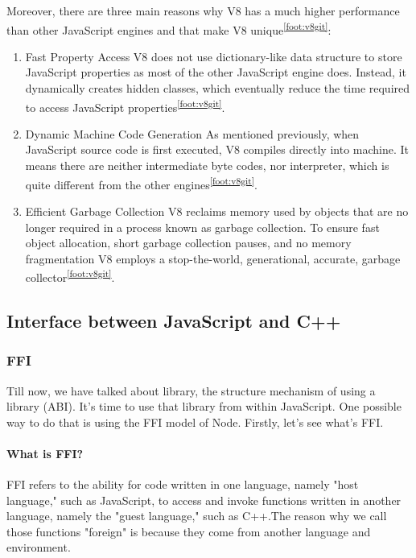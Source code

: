      
    Moreover, there are three main reasons why V8 has a much higher performance than other JavaScript engines and that make V8 unique\textsuperscript{\ref{foot:v8git}}:
        \begin{enumerate}
            \item  Fast Property Access\newline
            V8 does not use dictionary-like data structure to store JavaScript properties as most of the other JavaScript engine does. Instead, it dynamically creates hidden classes, which eventually reduce the time required to access JavaScript properties\textsuperscript{\ref{foot:v8git}}.
            
            \item  Dynamic Machine Code Generation\newline
            As mentioned previously, when JavaScript source code is first executed, V8 compiles directly into machine. It means there are neither intermediate byte codes, nor interpreter, which is quite different from the other engines\textsuperscript{\ref{foot:v8git}}.
            
            \item  Efficient Garbage Collection\newline
            V8 reclaims memory used by objects that are no longer required in a process known as garbage collection. To ensure fast object allocation, short garbage collection pauses, and no memory fragmentation V8 employs a stop-the-world, generational, accurate, garbage collector\textsuperscript{\ref{foot:v8git}}.
        \end{enumerate}



        
    
    \subsection{Interface between JavaScript and C++}
        \subsubsection{FFI}
               
            Till now, we have talked about library, the structure mechanism of using a library (ABI). It's time to use that library from within JavaScript. One possible way to do that is using the FFI model of Node. Firstly, let's see what's FFI.
            
            \paragraph{What is FFI?} FFI refers to the ability for code written in one language, namely "host language," such as JavaScript, to access and invoke functions written in another language, namely the "guest language," such as C++\cite{Sigbjorn-99}.The reason why we call those functions "foreign" is because they come from another language and environment.\cite{Matthias-Grimmer-14}
            
